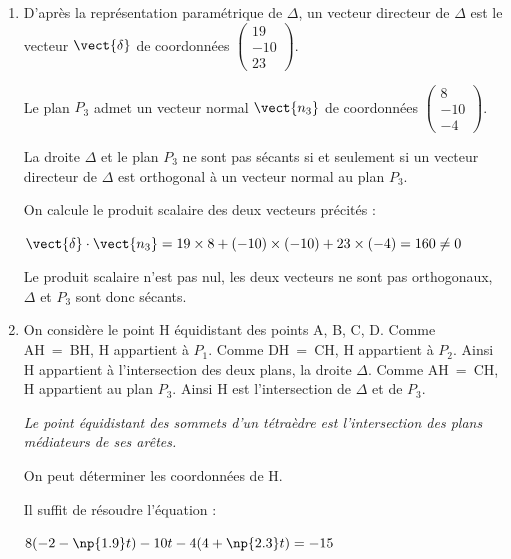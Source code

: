 \begin{enumerate}
	Tout point de $\Delta$ appartient à $P_1$.
	
	$\forall t \in \R\quad -3\times(-2-\np{1.9}t) - 8\times t + (4+\np{2.3}t) = 6 +\np{5.7}t- 8t + 4 +  \np{2.3}t = 10 $
	
	Tout point de $\Delta$ appartient à $P_2$.
	
	$\Delta$ est donc la droite d'intersection de   $P_1$ et $P_2$.
	\item D'après la représentation paramétrique de $\Delta$, un vecteur directeur de $\Delta$ est le vecteur $\vect{\delta}$ de coordonnées $\left(
		\begin{array}{c}
		19\\
		-10\\
		23
		\end{array}
		\right)$.
		
		Le plan  $P_3$ admet un vecteur normal $\vect{n_3}$ de coordonnées $\left(
		\begin{array}{c}
		8\\
		-10\\
		-4
		\end{array}
		\right)$.
		
La droite $\Delta$ et le plan $P_3$ ne sont pas sécants si et seulement si un vecteur directeur de $\Delta$ est orthogonal à un vecteur normal au plan $P_3$.
		
On calcule le produit scalaire des deux vecteurs précités :
\renewcommand\arraystretch{1}

$\vect{\delta} \cdot \vect{n_3} = 19 \times 8 + (-10) \times (-10) + 23 \times (-4) = 160 \neq 0$

		
Le produit scalaire n'est pas nul, les deux vecteurs ne sont pas orthogonaux, $\Delta$ et $P_3$ sont donc sécants.
	\item On considère le point H équidistant des points A, B, C, D. Comme AH~=~BH, H appartient à $P_1$. Comme DH~=~CH, H appartient à $P_2$. Ainsi H appartient à l'intersection des deux plans, la droite $\Delta$. Comme AH~=~CH, H appartient au plan $P_3$. Ainsi H est l'intersection de  $\Delta$ et de  $P_3$.
	
	\emph{Le point équidistant des sommets d'un tétraèdre est l'intersection des plans médiateurs de ses arêtes.}
	
On peut déterminer les coordonnées de H.
	
Il suffit de résoudre l'équation :
	
$8(-2-\np{1.9}t) -10t -4(4+\np{2.3}t) = -15$


\end{enumerate}
